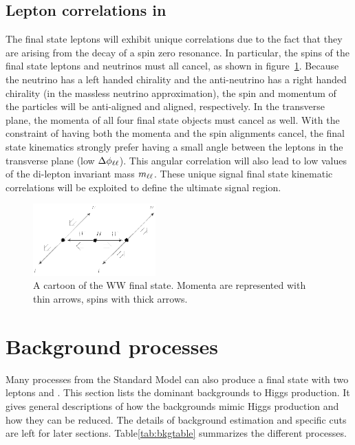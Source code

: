 \subsection{Lepton correlations in \HWWfull}


The final state leptons will exhibit unique correlations due to the fact that they are arising from the decay of a spin zero resonance. In particular, the spins of the final state leptons and neutrinos must all cancel, as shown in figure~\ref{fig:HWWdiagram}. Because the neutrino has a left handed
chirality and the anti-neutrino has a right handed chirality (in the massless neutrino approximation), the spin and momentum of the particles will be anti-aligned and aligned, respectively. In the transverse plane, the momenta of all four final state objects must cancel as well. With the constraint of having both the momenta and the spin alignments cancel, the final state kinematics strongly prefer having a small angle between the leptons in the transverse plane (low $\Delta\phi_{\ell\ell}$). This angular correlation will also lead to low values of the di-lepton invariant mass $m_{\ell\ell}$. These unique signal final state kinematic correlations will be exploited to define the ultimate signal region. 

\begin{figure}
  \vspace{20pt}
  \centering
  \hspace*{-32pt}
  \includegraphics[width=0.42\textwidth]{figures/ww_spins}
  \caption{A cartoon of the WW final state. Momenta are represented with thin arrows, spins with thick arrows. \cite{WW2015}}
  \label{fig:HWWdiagram}
\end{figure}


\section{Background processes}

Many processes from the Standard Model can also produce a final state with two leptons and \met. This section lists the dominant backgrounds to Higgs production. It gives general descriptions of how the backgrounds mimic Higgs production and how they can be reduced. The details of background estimation and specific cuts are left for later sections. Table\ref{tab:bkgtable} summarizes the different processes. 

